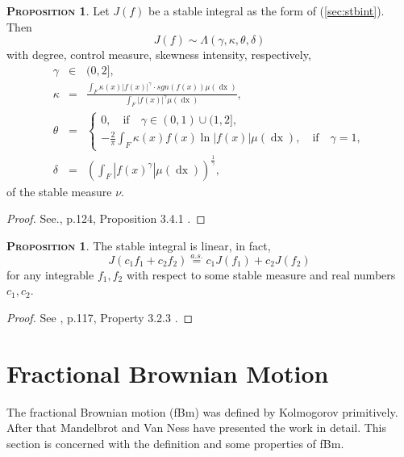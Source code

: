\documentclass[a4paper, twoside, 11pt]{article}
\theoremstyle{definition}
\newtheorem{proposition}[definition]{\scshape Proposition}
\newcommand{\brkt}[1]{\left({#1} \right)}
\begin{document}
  \begin{proposition}
	Let $J(f)$ be a stable integral as the form of (\ref{sec:stbint}). Then 
	\begin{equation*}
	  J(f) \sim \Lambda(\gamma, \kappa, \theta, \delta)
	\end{equation*}
  with degree, control measure, skewness intensity, respectively, 
  \begin{eqnarray*}
  \gamma &\in& (0, 2],\\
  \kappa &=& \frac{\int_F \kappa(x) |f(x)|^\gamma\cdot sgn(f(x)) \mu(\mathop{dx})}{\int_F|f(x)|^\gamma\mu(\mathop{dx})},\\
  \theta &=&
  \begin{cases}
  0 , \hspace{1em} \text{if} \hspace{1em} \gamma \in (0, 1) \cup (1, 2],\\
	-\frac{2}{\pi}\int_F \kappa(x) f(x) \ln|f(x)|\mu(\mathop{dx}), \hspace{1em} \text{if} \hspace{1em} \gamma = 1,
  \end{cases}\\
  \delta &=& \brkt{\int_F |f(x)^\gamma|\mu(\mathop{dx})}^{\frac{1}{\gamma}}, 
  \end{eqnarray*}
  of the stable measure $\nu$.
  \label{sec:stbint2}
  \end{proposition}
  \begin{proof}
	See.\cite{samorodnitsky}, p.124, Proposition 3.4.1 .
  \end{proof}
  \begin{proposition}
	The stable integral is linear, in fact,
  \begin{equation}
	J(c_1f_1 + c_2f_2) \overset{a.s.}{=}c_1J(f_1) + c_2J(f_2)
  \end{equation}
  for any integrable $f_1, f_2$ with respect to some stable measure and real numbers $c_1, c_2$. 
  \label{sec:stblin}
  \end{proposition}
  \begin{proof}
	See \cite{samorodnitsky}, p.117, Property 3.2.3 .
  \end{proof}
  \newpage
  \section{Fractional Brownian Motion}
  \setcounter{equation}{0}
  The fractional Brownian motion (fBm) was defined by Kolmogorov\cite{kolm} primitively. After that Mandelbrot and Van Ness\cite{mandelbrot} have presented the work in detail. This section is concerned with the definition and some properties of fBm.
\end{document}
